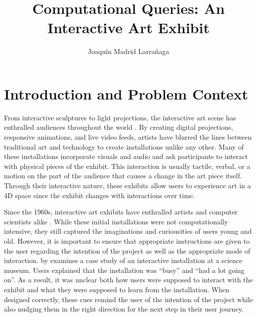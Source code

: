 \documentclass[10pt,twocolumn]{article}
\title{Computational Queries: An Interactive Art Exhibit}
\author{Joaquín Madrid Larrañaga}
\affiliation{Occidental College}
\begin{document}
\maketitle

\section{Introduction and Problem Context}
From interactive sculptures to light projections, the interactive art scene has enthralled audiences throughout the world \cite{sarto_disneys_2021, noauthor_teamlab_2020}.  By creating digital projections, responsive animations, and live video feeds, artists have blurred the lines between traditional art and technology to create installations unlike any other.  Many of these installations incorporate visuals and audio and ask participants to interact with physical pieces of the exhibit. This interaction is usually tactile, verbal, or a motion on the part of the audience that causes a change in the art piece itself.  Through their interactive nature, these exhibits allow users to experience art in a 4D space since the exhibit changes with interactions over time. 

Since the 1960s, interactive art exhibits have enthralled artists and computer scientists alike \cite{trifonova_software_2008}.  While these initial installations were not computationally intensive, they still captured the imaginations and curiousities of users young and old.  However, it is important to ensure that appropriate instructions are given to the user regarding the intention of the project as well as the appropriate mode of interaction.  by \citeauthor{hornecker_x201ci_2008} examines a case study of an interactive installation at a science museum.  Users explained that the installation was ``busy'' and ``had a lot going on''.  As a result, it was unclear both how users were supposed to interact with the exhibit and what they were supposed to learn from the installation. When designed correctly, these cues remind the user of the intention of the project while also nudging them in the right direction for the next step in their user journey.  
\end{document}
